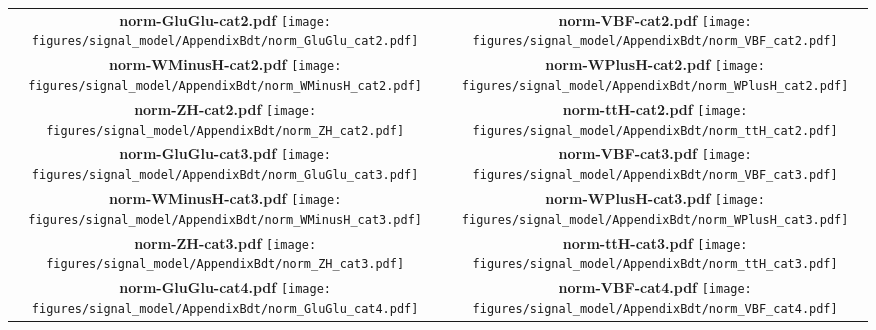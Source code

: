 \begin{longtable}{|c|c|}
{}
 \\
\hline
\parbox{0.47\textwidth}{
\centering
{\bfseries norm-GluGlu-cat2.pdf}
\texttt{[image: figures/signal\_model/AppendixBdt/norm\_GluGlu\_cat2.pdf]}
}
 & \parbox{0.47\textwidth}{
\centering
{\bfseries norm-VBF-cat2.pdf}
\texttt{[image: figures/signal\_model/AppendixBdt/norm\_VBF\_cat2.pdf]}
}
 \\
\hline
\parbox{0.47\textwidth}{
\centering
{\bfseries norm-WMinusH-cat2.pdf}
\texttt{[image: figures/signal\_model/AppendixBdt/norm\_WMinusH\_cat2.pdf]}
}
 & \parbox{0.47\textwidth}{
\centering
{\bfseries norm-WPlusH-cat2.pdf}
\texttt{[image: figures/signal\_model/AppendixBdt/norm\_WPlusH\_cat2.pdf]}
}
 \\
\hline
\parbox{0.47\textwidth}{
\centering
{\bfseries norm-ZH-cat2.pdf}
\texttt{[image: figures/signal\_model/AppendixBdt/norm\_ZH\_cat2.pdf]}
}
 & \parbox{0.47\textwidth}{
\centering
{\bfseries norm-ttH-cat2.pdf}
\texttt{[image: figures/signal\_model/AppendixBdt/norm\_ttH\_cat2.pdf]}
}
 \\
\hline
\parbox{0.47\textwidth}{
\centering
{\bfseries norm-GluGlu-cat3.pdf}
\texttt{[image: figures/signal\_model/AppendixBdt/norm\_GluGlu\_cat3.pdf]}
}
 & \parbox{0.47\textwidth}{
\centering
{\bfseries norm-VBF-cat3.pdf}
\texttt{[image: figures/signal\_model/AppendixBdt/norm\_VBF\_cat3.pdf]}
}
 \\
\hline
\parbox{0.47\textwidth}{
\centering
{\bfseries norm-WMinusH-cat3.pdf}
\texttt{[image: figures/signal\_model/AppendixBdt/norm\_WMinusH\_cat3.pdf]}
}
 & \parbox{0.47\textwidth}{
\centering
{\bfseries norm-WPlusH-cat3.pdf}
\texttt{[image: figures/signal\_model/AppendixBdt/norm\_WPlusH\_cat3.pdf]}
}
 \\
\hline
\parbox{0.47\textwidth}{
\centering
{\bfseries norm-ZH-cat3.pdf}
\texttt{[image: figures/signal\_model/AppendixBdt/norm\_ZH\_cat3.pdf]}
}
 & \parbox{0.47\textwidth}{
\centering
{\bfseries norm-ttH-cat3.pdf}
\texttt{[image: figures/signal\_model/AppendixBdt/norm\_ttH\_cat3.pdf]}
}
 \\
\hline
\parbox{0.47\textwidth}{
\centering
{\bfseries norm-GluGlu-cat4.pdf}
\texttt{[image: figures/signal\_model/AppendixBdt/norm\_GluGlu\_cat4.pdf]}
}
 & \parbox{0.47\textwidth}{
\centering
{\bfseries norm-VBF-cat4.pdf}
\texttt{[image: figures/signal\_model/AppendixBdt/norm\_VBF\_cat4.pdf]}
}
\end{longtable}
